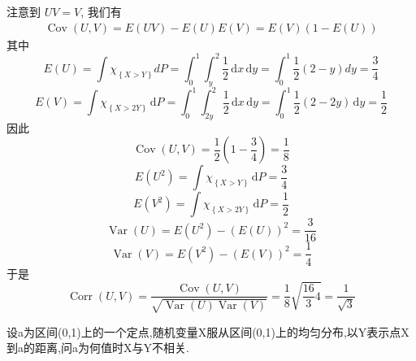 \documentclass[../main.tex]{subfiles}
\begin{document}
\begin{solution}
  注意到 \(  UV= V  \), 我们有 \[
  \begin{aligned}
  \operatorname{Cov}\left( U,V \right)= E\left( UV \right)-E\left( U \right)E\left( V \right)= E\left( V \right)\left( 1-E\left( U \right)  \right)       
  \end{aligned}
  \] 其中 \[
  E\left( U \right)= \int \chi _{\left\{ X> Y \right\}} dP= \int_{0}^{1}\int_{y}^{2}\frac{1 }{2 }\,\mathrm{d} x\,\mathrm{d} y=  \int_{0}^{1}\frac{1}{2}\left( 2-y \right)dy= \frac{3}{4} 
  \] \[
  E\left( V \right)= \int \chi _{\left\{ X> 2Y \right\}}\,\mathrm{d} P= \int_{0}^{1}\int_{2y}^{2} \frac{1}{2}\,\mathrm{d} x\,\mathrm{d}y = \int_{0}^{1}\frac{1}{2}\left( 2-2y \right)\,\mathrm{d} y= \frac{1}{2} 
  \]因此 \[
  \operatorname{Cov}\left( U,V \right)= \frac{1}{2}\left( 1-\frac{3}{4} \right)= \frac{1}{8}  
  \] \[
  E\left( U^{2} \right)= \int \chi _{\left\{ X> Y \right\}}\,\mathrm{d} P= \frac{3}{4} 
  \] \[
  E\left( V^{2} \right)= \int \chi _{\left\{ X> 2Y \right\}}\,\mathrm{d} P= \frac{1}{2} 
  \] \[
  \operatorname{Var}\left( U\right)= E\left( U^{2} \right)-\left( E\left( U \right)  \right)^{2}= \frac{3}{16}   
  \] \[
  \operatorname{Var}\left(V \right)= E\left( V^{2} \right)-\left( E\left( V \right)  \right)^{2}= \frac{1}{4}   
  \]于是 \[
  \operatorname{Corr}\left( U,V \right)= \frac{\operatorname{Cov}\left( U,V \right)  }{\sqrt{\operatorname{Var}\left(U  \right) \operatorname{Var}\left( V \right) } } = \frac{1}{8}\sqrt{\frac{16}{3}4}= \frac{1}{\sqrt{3}} 
  \]
\end{solution}

\begin{exercise}{}{}
设a为区间(0,1)上的一个定点,随机变量X服从区间(0,1)上的均匀分布,以Y表示点X到a的距离,问a为何值时X与Y不相关.
\end{exercise}
\end{document}
